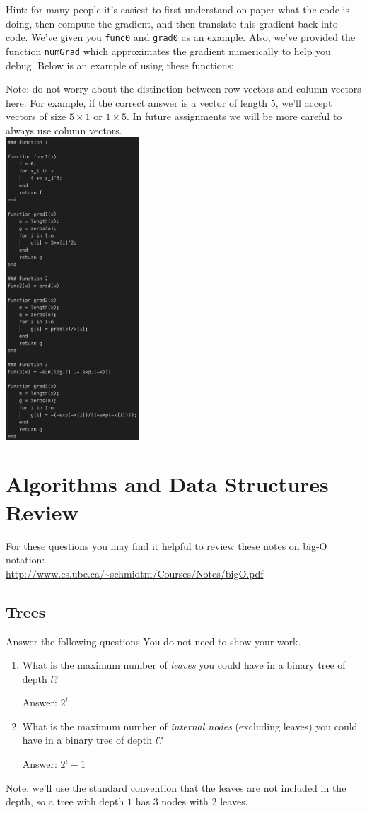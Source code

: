 \documentclass{article}
\def\ans#1{\par\gre{Answer: #1}}
\def\blu#1{{\color{blu}#1}}
\def\gre#1{{\color{gre}#1}}
\begin{document}
Hint: for many people it's easiest to first understand on paper what the code is doing, then compute
the gradient, and then translate this gradient back into code. We've given you \texttt{func0} and \texttt{grad0} as an example. Also, we've provided the function \texttt{numGrad} which approximates the gradient numerically to help you debug. Below is an example of using these functions:

Note: do not worry about the distinction between row vectors and column vectors here.
For example, if the correct answer is a vector of length 5, we'll accept vectors of size $5 \times 1$ or $1 \times 5$. In future assignments we will be more careful to always use column vectors.
\\
\includegraphics[width = 5cm]{DirivativeOfCode.png}

\section{Algorithms and Data Structures Review}

For these questions you may find it helpful to review these notes on big-O notation:\\
\url{http://www.cs.ubc.ca/~schmidtm/Courses/Notes/bigO.pdf}

\subsection{Trees}

\blu{Answer the following questions} You do not need to show your work.
\begin{enumerate}
\item What is the maximum number of \emph{leaves} you could have in a binary tree of depth $l$?
\ans{$2^{i}$}
\item What is the maximum number of \emph{internal nodes} (excluding leaves) you could have in a binary tree of depth $l$?
\ans{$2^{i}-1$}
\end{enumerate}
Note: we'll use the standard convention that the leaves are not included in the depth, so a tree with depth $1$ has 3 nodes with 2 leaves.
\end{document}
